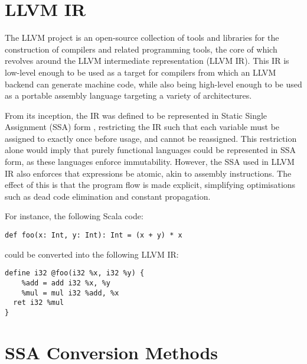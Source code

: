 
% 

\section{LLVM IR}

The LLVM project is an open-source collection of tools and libraries for the construction of
compilers and related programming tools, the core of which revolves around the LLVM intermediate
representation (LLVM IR). This IR is low-level enough to be used as a target for compilers from
which an LLVM backend can generate machine code, while also being high-level enough to be used as a
portable assembly language targeting a variety of architectures.

From its inception, the IR was defined to be represented in Static Single Assignment (SSA) form
\autocite{lattner2004llvm}, restricting the IR such that each variable must be assigned to exactly
once before usage, and cannot be reassigned. This restriction alone would imply that purely
functional languages could be represented in SSA form, as these languages enforce immutability.
However, the SSA used in LLVM IR also enforces that expressions be atomic, akin to assembly
instructions. The effect of this is that the program flow is made explicit, simplifying
optimisations such as dead code elimination and constant propagation.

For instance, the following Scala code:

\begin{verbatim}
def foo(x: Int, y: Int): Int = (x + y) * x
\end{verbatim}

could be converted into the following LLVM IR:

\begin{verbatim}
define i32 @foo(i32 %x, i32 %y) {
    %add = add i32 %x, %y
    %mul = mul i32 %add, %x
  ret i32 %mul
}
\end{verbatim}

\section{SSA Conversion Methods}

